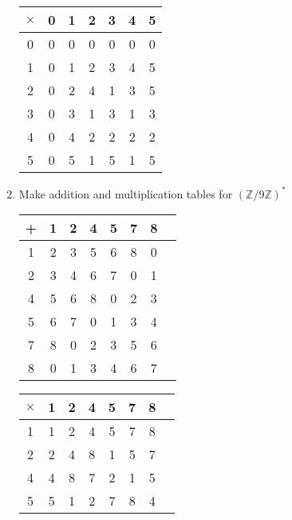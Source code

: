 \documentclass[a4paper, 11pt]{article}
\begin{document}
\begin{enumerate}[label=(\alph*)]
\begin{tabular}{ |c|c|c|c|c|c|c| }
                \hline
                    $\times$ & 0 & 1 & 2 & 3 & 4 & 5\\ 
                \hline
                    0 & 0 & 0 & 0 & 0 & 0 & 0\\ 
                \hline
                    1 & 0 & 1 & 2 & 3 & 4 & 5\\ 
                \hline
                    2 & 0 & 2 & 4 & 1 & 3 & 5\\ 
                \hline
                    3 & 0 & 3 & 1 & 3 & 1 & 3\\ 
                \hline
                    4 & 0 & 4 & 2 & 2 & 2 & 2\\ 
                \hline
                    5 & 0 & 5 & 1 & 5 & 1 & 5\\ 
                \hline
            \end{tabular}
        \item Make addition and multiplication tables for $(\mathbb{Z}/9\mathbb{Z})^*$\\
            \begin{tabular}{ |c|c|c|c|c|c|c|c| } 
                \hline
                    + & 1 & 2 & 4 & 5 & 7 & 8\\ 
                \hline
                    1 & 2 & 3 & 5 & 6 & 8 & 0\\ 
                \hline
                    2 & 3 & 4 & 6 & 7 & 0 & 1\\ 
                \hline
                    4 & 5 & 6 & 8 & 0 & 2 & 3\\ 
                \hline
                    5 & 6 & 7 & 0 & 1 & 3 & 4\\ 
                \hline
                    7 & 8 & 0 & 2 & 3 & 5 & 6\\ 
                \hline
                    8 & 0 & 1 & 3 & 4 & 6 & 7\\ 
                \hline
            \end{tabular}
            \quad
            \begin{tabular}{ |c|c|c|c|c|c|c|c| } 
                \hline
                    $\times$ & 1 & 2 & 4 & 5 & 7 & 8\\ 
                \hline
                    1 & 1 & 2 & 4 & 5 & 7 & 8\\ 
                \hline
                    2 & 2 & 4 & 8 & 1 & 5 & 7\\ 
                \hline
                    4 & 4 & 8 & 7 & 2 & 1 & 5\\ 
                \hline
                    5 & 5 & 1 & 2 & 7 & 8 & 4\\ 

\end{tabular}
\end{enumerate}
\end{document}

